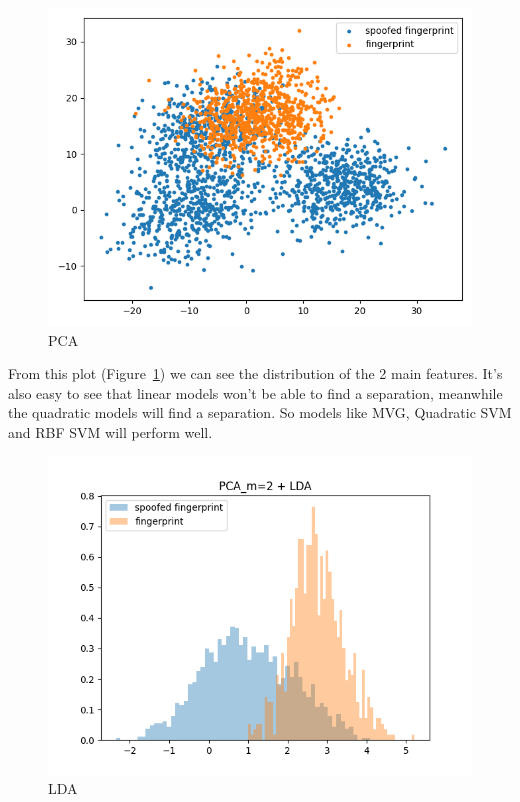 \documentclass[english]{report}
\begin{document}
    \begin{figure}[H]
        \centering
        \includegraphics[scale=0.5]{../../images/feature_plot/PCA_m=2}
        \caption{PCA}
        \label{fig:PCA}
    \end{figure}

    From this plot (Figure~\ref{fig:PCA}) we can see the distribution of the 2 main features. It's also easy to see that linear
    models won't be able to find a separation, meanwhile the quadratic models will find a separation. So models like MVG, Quadratic
    SVM and RBF SVM will perform well.

    \begin{figure}[H]
        \centering
        \includegraphics[scale=0.5]{../../images/feature_plot/histPCA_m=2 + LDA.png}
        \caption{LDA}
        \label{fig:LDA}
    \end{figure}
\end{document}
